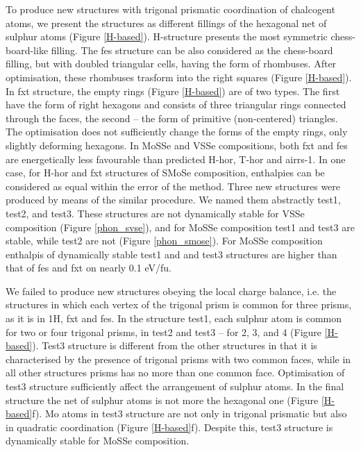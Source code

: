 \documentclass[a4paperm]{article}
\begin{document}
To produce new structures with trigonal prismatic coordination of chalcogent atoms, we present the structures as different fillings of the hexagonal net of sulphur atoms (Figure \ref{H-based}).
H-structure presents the most symmetric chess-board-like filling.
The fes structure can be also considered as the chess-board filling, but with doubled triangular cells, having the form of rhombuses.
After optimisation, these rhombuses trasform into the right squares (Figure \ref{H-based}).
In fxt structure, the empty rings (Figure \ref{H-based}) are of two types.
The first have the form of right hexagons and consists of three triangular rings connected through the faces, the second -- the form of primitive (non-centered) triangles.
The optimisation does not sufficiently change the forms of the empty rings, only slightly deforming hexagons.
In MoSSe and VSSe compositions, both fxt and fes are energetically less favourable than predicted H-hor, T-hor and airrs-1.
In one case, for H-hor and fxt structures of SMoSe composition, enthalpies can be considered as equal within the error of the method.
Three new structures were produced by means of the similar procedure.
We named them abstractly test1, test2, and test3.
These structures are not dynamically stable for VSSe composition (Figure \ref{phon_svse}), and for MoSSe composition test1 and test3 are stable, while test2 are not (Figure \ref{phon_smose}).
For MoSSe composition enthalpis of dynamically stable test1 and and test3 structures are higher than that of  fes and fxt on nearly 0.1 eV/fu.

We failed to produce new structures obeying the local charge balance, i.e. the structures in which each vertex of the trigonal prism is common for three prisms, as it is in 1H, fxt and fes.
In the structure test1, each sulphur atom is common for two or four trigonal prisms, in test2 and test3 – for 2, 3, and 4 (Figure \ref{H-based}).
Test3 structure is different from the other structures in that it is characterised by the presence of trigonal prisms with two common faces, while in all other structures prisms has no more than one common face.
Optimisation of test3 structure sufficiently affect the arrangement of sulphur atoms.
In the final structure the net of sulphur atoms is not more the hexagonal one (Figure \ref{H-based}f).
Mo atoms in test3 structure are not only in trigonal prismatic but also in quadratic coordination (Figure \ref{H-based}f).
Despite this, test3 structure is dynamically stable for MoSSe composition.
\end{document}
